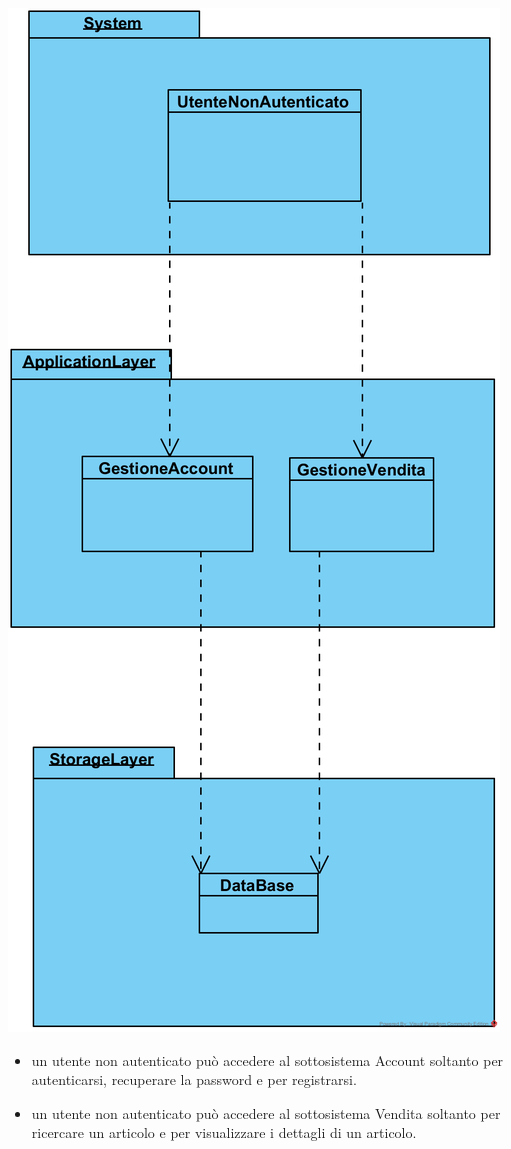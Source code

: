 \documentclass[12pt,a4paper]{article}
\begin{document}
\begin{center}
\includegraphics[height=0.34\textheight]{UtenteNonAutenticato}
\end{center}

\begin{itemize}
\item un utente non autenticato può accedere al sottosistema Account soltanto per autenticarsi, recuperare la password e per registrarsi.
\item un utente non autenticato può accedere al sottosistema Vendita soltanto per ricercare un articolo e per visualizzare i dettagli di un articolo.
\end{itemize}
\end{document}
